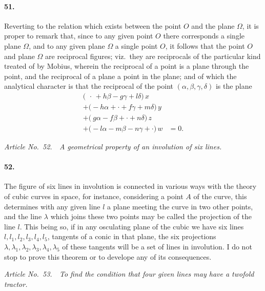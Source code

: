\documentclass[11pt,a4paper]{article}
\begin{document}
\paragraph{51.}
Reverting to the relation which exists between the point $O$ and the plane
$\Omega$, it is proper to remark that, since to any given point $O$ there corresponds a single
plane $\Omega$, and to any given plane $\Omega$ a single point $O$, it follows that the point $O$
and plane $\Omega$ are reciprocal figures; viz.\ they are reciprocals of the particular kind
treated of by Mobius, wherein the reciprocal of a point is a plane through the point,
and the reciprocal of a plane a point in the plane; and of which the analytical
character is that the reciprocal of the point $(\alpha, \beta, \gamma, \delta)$ is the plane
\begin{align*}
\bigl(\ \,\cdot\, + h\beta - g\gamma + l\delta\bigr)\,x & \\
+ \bigl(-h\alpha + \cdot + f\gamma + m\delta\bigr)\,y & \\
+ \bigl(\ g\alpha - f\beta + \cdot + n\delta\bigr)\,z & \\
+ \bigl(-l\alpha - m\beta - n\gamma + \cdot \bigr)\,w &= 0.
\end{align*}

\bigskip
\begin{center}
\textit{Article No.\ 52.\ \ A geometrical property of an involution of six lines.}
\end{center}

\paragraph{52.}
The figure of six lines in involution is connected in various ways with the
theory of cubic curves in space, for instance, considering a point $A$ of the curve, this
determines with any given line $l$ a plane meeting the curve in two other points, and
the line $\lambda$ which joins these two points may be called the projection of the line $l$.
This being so, if in any osculating plane of the cubic we have six lines
$l, l_1, l_2, l_3, l_4, l_5$, tangents of a conic in that plane, the six projections
$\lambda, \lambda_1, \lambda_2, \lambda_3, \lambda_4, \lambda_5$ of these tangents will be a set of lines in
involution. I do not stop to prove this theorem or to develope any of its consequences.

\bigskip
\begin{center}
\textit{Article No.\ 53.\ \ To find the condition that four given lines may have a twofold tractor.}
\end{center}
\end{document}
